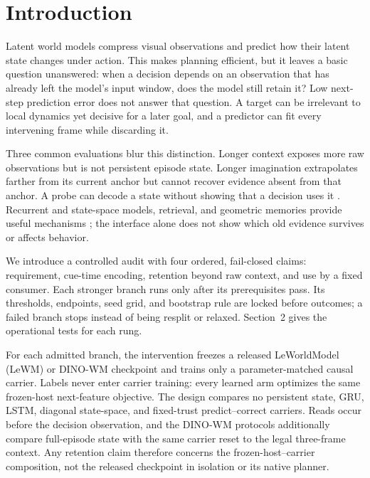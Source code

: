 \section{Introduction}

Latent world models compress visual observations and predict how their latent
state changes under action.  This makes planning efficient, but it leaves a
basic question unanswered: when a decision depends on an observation that has
already left the model's input window, does the model still retain it?  Low
next-step prediction error does not answer that question.  A target can be
irrelevant to local dynamics yet decisive for a later goal, and a predictor can
fit every intervening frame while discarding it.

Three common evaluations blur this distinction.  Longer context exposes more
raw observations but is not persistent episode state.  Longer imagination
extrapolates farther from its current anchor but cannot recover evidence absent
from that anchor.  A probe can decode a state without showing that a decision
uses it \citep{r_belinkov,r_ravich}.  Recurrent and state-space models, retrieval, and geometric memories
provide useful mechanisms \citep{r_dreamerv3,r_r2i,r_s4wm,r_memworld}; the
interface alone does not show which old evidence survives or affects behavior.

We introduce a controlled audit with four ordered, fail-closed claims:
requirement, cue-time encoding, retention beyond raw context, and use by a fixed
consumer.  Each stronger branch runs only after its prerequisites pass.  Its
thresholds, endpoints, seed grid, and bootstrap rule are locked before outcomes;
a failed branch stops instead of being resplit or relaxed.  Section~2 gives the
operational tests for each rung.

For each admitted branch, the intervention freezes a released LeWorldModel
(LeWM) \citep{r_lewm} or DINO-WM \citep{r_dinowm} checkpoint and trains only a
parameter-matched causal carrier.  Labels never enter carrier training: every
learned arm optimizes the same frozen-host next-feature objective.  The design
compares no persistent state, GRU, LSTM, diagonal state-space, and fixed-trust
predict--correct carriers.  Reads occur before the decision observation, and
the DINO-WM protocols additionally compare full-episode state with the same
carrier reset to the legal three-frame context.  Any retention claim therefore
concerns the frozen-host--carrier composition, not the released checkpoint in
isolation or its native planner.

